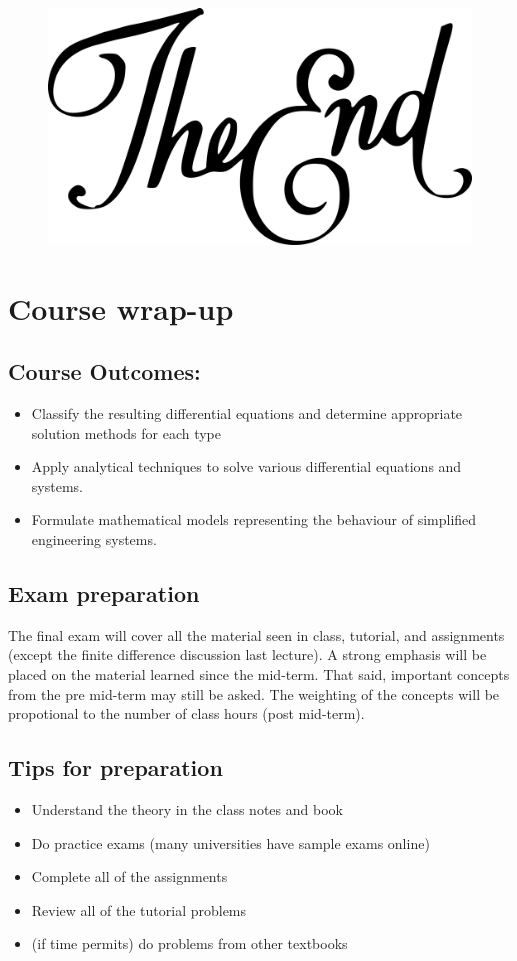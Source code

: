 \begin{figure}[h!]
\centering
\includegraphics{figs/the_end.png}
\end{figure}

\clearpage


\section*{Course wrap-up}
\subsection*{Course Outcomes:}
\begin{itemize}
\item Classify the resulting differential equations and determine appropriate solution methods for each type
 \item  Apply analytical techniques to solve various differential equations and systems.
\item Formulate mathematical models representing the behaviour of simplified engineering systems.  
 \end{itemize}

\subsection*{Exam preparation}
The final exam will cover all the material seen in class, tutorial, and assignments (except the finite difference discussion last lecture). A strong emphasis will be placed on the material learned since the mid-term. That said, important concepts from the pre mid-term may still be asked. The weighting of the concepts will be propotional to the number of class hours (post mid-term).

\subsection*{Tips for preparation}
\begin{itemize}
\item Understand the theory in the class notes and book
\item Do practice exams (many universities have sample exams online)
\item Complete all of the assignments
\item Review all of the tutorial problems
\item (if time permits) do problems from other textbooks
\end{itemize}



